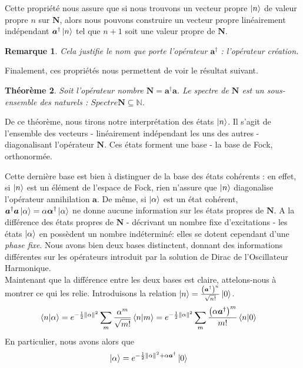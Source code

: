 \documentclass[11pt,oneside,a4paper]{article}
\newtheorem{theorem}{Théorème}[section]
\newtheorem{remark}[theorem]{Remarque}
\begin{document}
Cette propriété nous assure que si nous trouvons un vecteur propre $\ket{n}$ de valeur propre $n$ sur $\bm{N}$, alors nous pouvons construire un vecteur propre linéairement indépendant $\bm{a}^\dagger\ket{n}$ tel que $n+1$ soit une valeur propre de $\bm{N}$.
\begin{remark}
  Cela justifie le nom que porte l'opérateur $\bm{a}^\dagger$ : l'opérateur création.
\end{remark}
Finalement, ces propriétés nous permettent de voir le résultat suivant.
\begin{theorem}
  Soit l'opérateur nombre $\bm{N} = \bm{a}^\dagger\bm{a}$. Le spectre de $\bm{N}$ est un sous-ensemble des naturels : $Spectre \bm{N}\subseteq\mathbb{N}$.
\end{theorem}

De ce théorème, nous tirons notre interprétation des états $\ket{n}$. Il s'agit de l'ensemble des vecteurs - linéairement indépendant les uns des autres - diagonalisant l'opérateur $\bm{N}$. Ces états forment une base - la base de Fock, orthonormée. 

Cette dernière base est bien à distinguer de la base des états cohérents : en effet, si $\ket{n}$ est un élément de l'espace de Fock, rien n'assure que $\ket{n}$ diagonalise l'opérateur annihilation $\bm{a}$. De même, si $\ket{\alpha}$ est un état cohérent, $\bm{a}^\dagger \bm{a}\ket{\alpha} = \alpha \bm{\alpha}^\dagger\ket{\alpha}$ ne donne aucune information sur les états propres de $\bm{N}$. A la différence des états propres de $\bm{N}$ - décrivant un nombre fixe d'excitations - les états $\ket{\alpha}$ en possèdent un nombre indéterminé: elles se dotent cependant d'une \emph{phase fixe}. Nous avons bien deux bases distinctent, donnant des informations différentes sur les opérateurs introduit par la solution de Dirac de l'Oscillateur Harmonique.\\

Maintenant que la différence entre les deux bases est claire, attelons-nous à montrer ce qui les relie. Introduisons la relation $\ket{n} = \frac{\left(\bm{a}^\dagger\right)^n}{\sqrt{n!}}\ket{0}$. 
\begin{align}
  \braket{n}{\alpha} &= e^{-\frac{1}{2}\norm{\alpha}^2} \sum_m \frac{\alpha^m}{\sqrt{m!}}\braket{n}{m}
  = e^{-\frac{1}{2}\norm{\alpha}^2} \sum_m \frac{\left(\alpha\bm{a}^\dagger\right)^m}{m!}\braket{n}{0}
\end{align}
En particulier, nous avons alors que
\begin{align}
  \label{Création à partir du vide}
  \ket{\alpha} &= e^{-\frac{1}{2}\norm{\alpha}^2+\alpha\bm{a}^\dagger}\ket{0}
\end{align}
\end{document}
